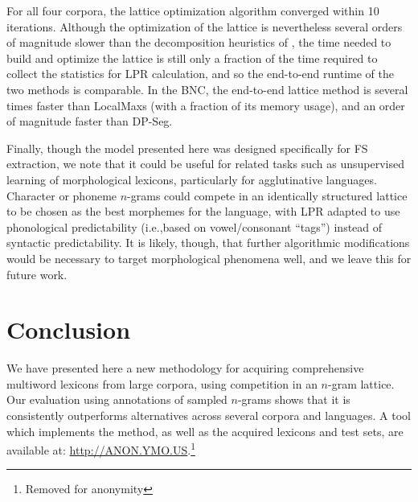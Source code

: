 \documentclass[11pt,letterpaper]{article}
\makeatletter
\def \ie {i.e.,\@ }
\makeatother
\begin{document}
For all four corpora, the lattice optimization algorithm converged within 10 iterations.  Although the optimization of the lattice is nevertheless several orders of magnitude slower than the decomposition heuristics of , the time needed to build and optimize the lattice is still only a fraction of the time required to collect the statistics for LPR calculation, and so the end-to-end runtime of the two methods is comparable. In the BNC, the end-to-end lattice method is several times faster than LocalMaxs (with a fraction of its memory usage), and an order of magnitude faster than DP-Seg. 



Finally, though the model presented here was designed specifically for FS extraction, we note that it could be useful for related tasks such as unsupervised learning of morphological lexicons, particularly for agglutinative languages. Character or phoneme $n$-grams could compete in an identically structured lattice to be chosen as the best morphemes for the language, with LPR adapted to use phonological predictability (\ie based on vowel/consonant ``tags'') instead of syntactic predictability. It is likely, though, that further algorithmic modifications would be necessary to target morphological phenomena well, and we leave this for future work.

\section{Conclusion}

We have presented here a new methodology for acquiring comprehensive multiword lexicons from large corpora, using competition in an $n$-gram lattice. Our evaluation using annotations of sampled $n$-grams shows that it is consistently outperforms alternatives across several corpora and languages. A tool which implements the method, as well as the acquired lexicons and test sets, are available at: \url{http://ANON.YMO.US}.\footnote{Removed for anonymity} 





\end{document}
